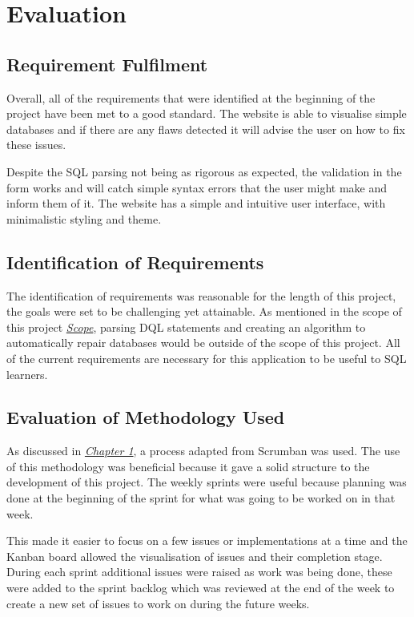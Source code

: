 \chapter{Evaluation}

\section{Requirement Fulfilment}

Overall, all of the requirements that were identified at the beginning of the project have been met to a good standard. The website is able to visualise simple databases and if there are any flaws detected it will advise the user on how to fix these issues. 

Despite the SQL parsing not being as rigorous as expected, the validation in the form works and will catch simple syntax errors that the user might make and inform them of it. The website has a simple and intuitive user interface, with minimalistic styling and theme.

\section{Identification of Requirements}

The identification of requirements was reasonable for the length of this project, the goals were set to be challenging yet attainable. As mentioned in the scope of this project \textit{\hyperref[subsec:scope]{Scope}}, parsing DQL statements and creating an algorithm to automatically repair databases would be outside of the scope of this project. All of the current requirements are necessary for this application to be useful to SQL learners.

\section{Evaluation of Methodology Used}

As discussed in \textit{\hyperref[sec:process]{Chapter 1}}, a process adapted from Scrumban was used. The use of this methodology was beneficial because it gave a solid structure to the development of this project. The weekly sprints were useful because planning was done at the beginning of the sprint for what was going to be worked on in that week. 

This made it easier to focus on a few issues or implementations at a time and the Kanban board allowed the visualisation of issues and their completion stage. During each sprint additional issues were raised as work was being done, these were added to the sprint backlog which was reviewed at the end of the week to create a new set of issues to work on during the future weeks. 

